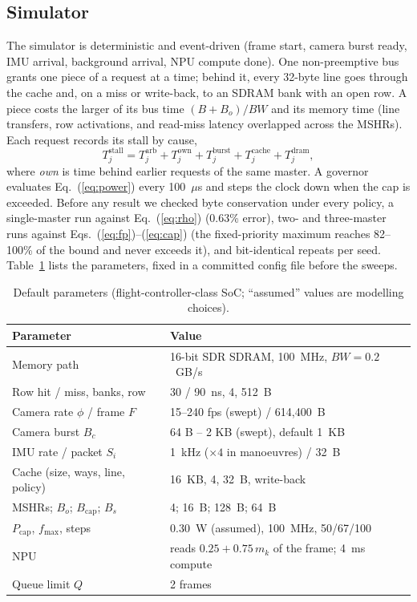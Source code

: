 \documentclass[conference]{IEEEtran}
\begin{document}
\subsection{Simulator}
The simulator is deterministic and event-driven (frame start, camera burst ready, IMU arrival, background arrival, NPU compute done). One non-preemptive bus grants one piece of a request at a time; behind it, every 32-byte line goes through the cache and, on a miss or write-back, to an SDRAM bank with an open row. A piece costs the larger of its bus time $(B+B_o)/BW$ and its memory time (line transfers, row activations, and read-miss latency overlapped across the MSHRs). Each request records its stall by cause,
\begin{equation}
T^{\mathrm{stall}}_j=T^{\mathrm{arb}}_j+T^{\mathrm{own}}_j+T^{\mathrm{burst}}_j+T^{\mathrm{cache}}_j+T^{\mathrm{dram}}_j,
\end{equation}
where \textit{own} is time behind earlier requests of the same master. A governor evaluates Eq.~(\ref{eq:power}) every 100~$\mu$s and steps the clock down when the cap is exceeded. Before any result we checked byte conservation under every policy, a single-master run against Eq.~(\ref{eq:rho}) (0.63\% error), two- and three-master runs against Eqs.~(\ref{eq:fp})--(\ref{eq:cap}) (the fixed-priority maximum reaches 82--100\% of the bound and never exceeds it), and bit-identical repeats per seed. Table~\ref{tab:params} lists the parameters, fixed in a committed config file before the sweeps.
\begin{table}[t]\centering\caption{Default parameters (flight-controller-class SoC; ``assumed'' values are modelling choices).}\label{tab:params}
\footnotesize\begin{tabular}{@{}p{}p{}@{}}\toprule
Parameter & Value\\\midrule
Memory path & 16-bit SDR SDRAM, 100~MHz, $BW=0.2$~GB/s\\
Row hit / miss, banks, row & 30 / 90~ns, 4, 512~B\\
Camera rate $\phi$ / frame $F$ & 15--240 fps (swept) / 614{,}400~B\\
Camera burst $B_c$ & 64 B -- 2 KB (swept), default 1~KB\\
IMU rate / packet $S_i$ & 1~kHz ($\times4$ in manoeuvres) / 32~B\\
Cache (size, ways, line, policy) & 16~KB, 4, 32~B, write-back\\
MSHRs; $B_o$; $B_{\mathrm{cap}}$; $B_s$ & 4; 16~B; 128~B; 64~B\\
$P_{\mathrm{cap}}$, $f_{\max}$, steps & 0.30~W (assumed), 100~MHz, 50/67/100\\
NPU & reads $0.25+0.75\,m_k$ of the frame; 4~ms compute\\
Queue limit $Q$ & 2 frames\\\bottomrule
\end{tabular}\end{table}
\end{document}
